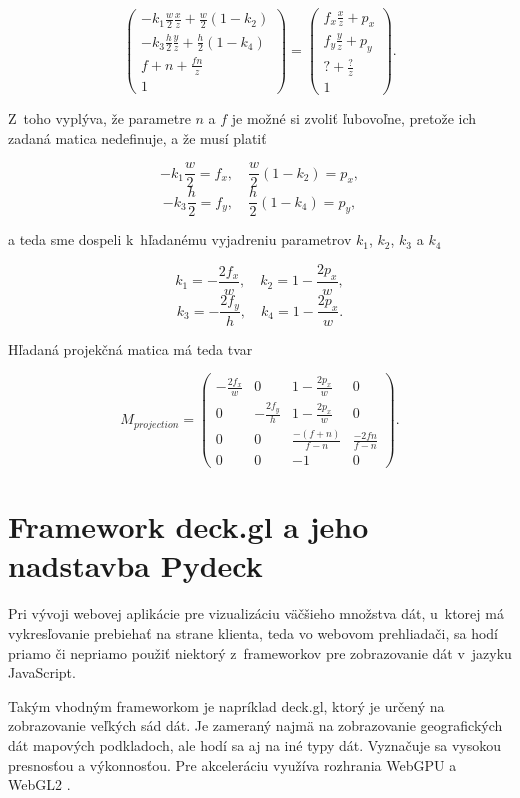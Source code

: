 $$
\begin{pmatrix}
- k_1 \frac{w}{2} \frac{x}{z} + \frac{w}{2} (1 - k_2)\\
- k_3 \frac{h}{2} \frac{y}{z} + \frac{h}{2} (1 - k_4)\\
f + n + \frac{fn}{z} \\
1
\end{pmatrix}
=
\begin{pmatrix}
f_x \frac{x}{z} + p_x \\
f_y \frac{y}{z} + p_y \\
? + \frac{?}{z} \\
1
\end{pmatrix} \mathrm{.}
$$

Z~toho vyplýva, že parametre $n$ a $f$ je možné si zvoliť ľubovoľne, pretože ich zadaná matica nedefinuje, a že musí platiť

$$
-k_1 \frac{w}{2} = f_x 
\mathrm{,} \quad
\frac{w}{2} (1 - k_2) = p_x \mathrm{,}
$$
$$
-k_3 \frac{h}{2} = f_y
\mathrm{,} \quad
\frac{h}{2} (1 - k_4) = p_y \mathrm{,}
$$

a teda sme dospeli k~hľadanému vyjadreniu parametrov $k_1$, $k_2$, $k_3$ a $k_4$

$$
k_1 = - \frac{2 f_x}{w}
\mathrm{,} \quad
k_2 = 1 - \frac{2 p_x}{w} \mathrm{,}
$$
$$
k_3 = - \frac{2 f_y}{h}
\mathrm{,} \quad
k_4 = 1 - \frac{2 p_x}{w} \mathrm{.}
$$

Hľadaná projekčná matica má teda tvar

$$
M_{projection}
=
\begin{pmatrix}
- \frac{2 f_x}{w} & 0 & 1 - \frac{2 p_x}{w} & 0 \\
0 & - \frac{2 f_y}{h} & 1 - \frac{2 p_x}{w} & 0 \\
0 & 0 & \frac{-(f+n)}{f-n} & \frac{-2fn}{f-n} \\
0 & 0 & -1 & 0
\end{pmatrix} \mathrm{.}
$$

\section{Framework deck.gl a jeho nadstavba Pydeck}
\label{sec:deck_gl}

Pri vývoji webovej aplikácie pre vizualizáciu väčšieho množstva dát, u~ktorej má vykresľovanie prebiehať na strane klienta, teda vo webovom prehliadači, sa hodí priamo či nepriamo použiť niektorý z~frameworkov pre zobrazovanie dát v~jazyku JavaScript.

Takým vhodným frameworkom je napríklad deck.gl, ktorý je určený na zobrazovanie veľkých sád dát. Je zameraný najmä na zobrazovanie geografických dát mapových podkladoch, ale hodí sa aj na iné typy dát. Vyznačuje sa vysokou presnosťou a výkonnosťou. Pre akceleráciu využíva rozhrania WebGPU a WebGL2 \cite{deck.gl_documentation}.

